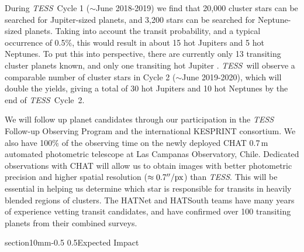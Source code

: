 \documentclass[letterpaper,11pt]{article}
\makeatletter
\renewcommand\section{\@startsection%
{section}{1}{0mm}{-0.5\baselineskip}%
{0.5\baselineskip}{\normalfont\normalsize\bfseries}}%
\newcommand{\tess}{{\it TESS}}
\makeatother
\begin{document}
During \tess\ Cycle 1 ($\sim$June 2018-2019) we find that 20,000 cluster stars 
can be searched for Jupiter-sized planets, and 3,200 stars can be searched for
Neptune-sized planets.  Taking into account the transit probability,
and a typical occurrence of 0.5\%, this would result in about 15 hot
Jupiters and 5 hot Neptunes.  To put this into perspective, there are
currently only 13 transiting cluster planets known, and only one transiting hot
Jupiter \citep{David_et_al_2017,Mann_et_al_2017}.
\tess\ will observe a comparable number of cluster stars in Cycle 2 
($\sim$June 2019-2020), which will double the yields, giving a total of 30 hot 
Jupiters and 10 hot Neptunes by the end of \tess\ Cycle~2.

We will follow up planet candidates through our participation in the {\it TESS}
Follow-up Observing Program and the international KESPRINT consortium.
We also have 100\% of the observing time on the newly deployed CHAT
0.7$\,$m automated photometric telescope at Las Campanas Observatory,
Chile. Dedicated observations with CHAT will allow us to obtain images with 
better photometric precision and higher spatial resolution ($\approx 
0.7''/{\rm px}$) than {\it TESS}. This will be essential in helping us
determine which star is responsible for transits in heavily blended regions of 
clusters.
The HATNet and HATSouth teams have many years of experience vetting transit 
candidates, and have confirmed over 100 transiting planets from their combined 
surveys.

\vspace{-0.3mm}
\section{Expected Impact}
\label{sec:impact}
\end{document}
